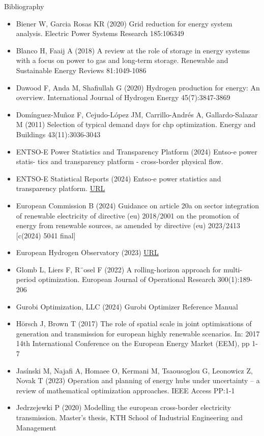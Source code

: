   \begin{frame}{Bibliography}
    \tiny
    \begin{itemize}
      \item Biener W, Garcia Rosas KR (2020) Grid reduction for energy system analysis. Electric
      Power Systems Research 185:106349
      \item Blanco H, Faaij A (2018) A review at the role of storage in energy systems with a
      focus on power to gas and long-term storage. Renewable and Sustainable Energy
      Reviews 81:1049-1086
      \item Dawood F, Anda M, Shafiullah G (2020) Hydrogen production for energy: An overview.
      International Journal of Hydrogen Energy 45(7):3847-3869
      \item Dom\'{i}nguez-Mu\~{n}oz F, Cejudo-L\'{o}pez JM, Carrillo-Andr\'{e}s A, Gallardo-Salazar M (2011)
      Selection of typical demand days for chp optimization. Energy and Buildings
      43(11):3036-3043
      \item ENTSO-E Power Statistics and Transparency Platform (2024) Entso-e power statis-
      tics and transparency platform - cross-border physical flow.
      \item ENTSO-E Statistical Reports (2024) Entso-e power statistics and transparency platform.
       \href{https://www.entsoe.eu/data/power-stats/}{URL}
      \item European Commission B (2024) Guidance on article 20a on sector integration of renewable
      electricity of directive (eu) 2018/2001 on the promotion of energy from renewable
      sources, as amended by directive (eu) 2023/2413 [c(2024) 5041 final]
      \item European Hydrogen Observatory (2023) \href{https://observatory.clean-hydrogen.europa.eu/tools-reports/levelised-cost-hydrogen-calculator}{URL}
      \item Glomb L, Liers F, R¨osel F (2022) A rolling-horizon approach for multi-period optimization.
      European Journal of Operational Research 300(1):189-206
      \item Gurobi Optimization, LLC (2024) Gurobi Optimizer Reference Manual
      \item H\"{o}rsch J, Brown T (2017) The role of spatial scale in joint optimisations of generation
      and transmission for european highly renewable scenarios. In: 2017 14th International
      Conference on the European Energy Market (EEM), pp 1-7
      \item Jas\'{i}nski M, Najafi A, Homaee O, Kermani M, Tsaousoglou G, Leonowicz Z, Novak T (2023)
      Operation and planning of energy hubs under uncertainty -- a review of mathematical
      optimization approaches. IEEE Access PP:1-1
      \item Jedrzejewki P (2020) Modelling the european cross-border electricity transmission. Master’s
      thesis, KTH School of Industrial Engineering and Management
    \end{itemize}
  \end{frame}
